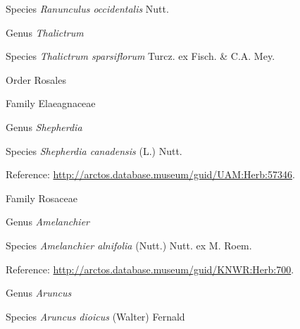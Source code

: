 \documentclass[9pt, article]{memoir}
\begin{document}
\begin{multicols}{2}
\vspace{6pt}\noindent\hspace{36pt}Species \textit{Ranunculus occidentalis} Nutt.


\vspace{6pt}\noindent\hspace{30pt}Genus \textit{Thalictrum}


\vspace{6pt}\noindent\hspace{36pt}Species \textit{Thalictrum sparsiflorum} Turcz. ex Fisch. \& C.A. Mey.


\vspace{6pt}\noindent\hspace{18pt}Order Rosales


\vspace{6pt}\noindent\hspace{24pt}Family Elaeagnaceae


\vspace{6pt}\noindent\hspace{30pt}Genus \textit{Shepherdia}


\vspace{6pt}\noindent\hspace{36pt}Species \textit{Shepherdia canadensis} (L.) Nutt.


\vspace{6pt}Reference: 
\url{http://arctos.database.museum/guid/UAM:Herb:57346}.

\vspace{6pt}\noindent\hspace{24pt}Family Rosaceae


\vspace{6pt}\noindent\hspace{30pt}Genus \textit{Amelanchier}


\vspace{6pt}\noindent\hspace{36pt}Species \textit{Amelanchier alnifolia} (Nutt.) Nutt. ex M. Roem.


\vspace{6pt}Reference: 
\url{http://arctos.database.museum/guid/KNWR:Herb:700}.

\vspace{6pt}\noindent\hspace{30pt}Genus \textit{Aruncus}


\vspace{6pt}\noindent\hspace{36pt}Species \textit{Aruncus dioicus} (Walter) Fernald



\end{multicols}
\end{document}
